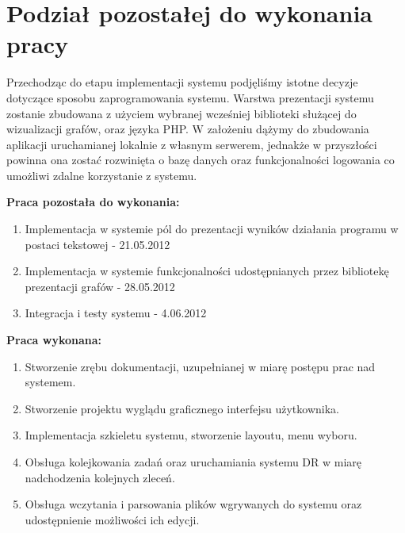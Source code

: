 \chapter{Podział pozostałej do wykonania pracy}
Przechodząc do etapu implementacji systemu podjęliśmy istotne decyzje dotyczące sposobu zaprogramowania systemu. Warstwa prezentacji systemu zostanie zbudowana z użyciem wybranej wcześniej biblioteki służącej do wizualizacji grafów, oraz języka PHP. W założeniu dążymy do zbudowania aplikacji uruchamianej lokalnie z własnym serwerem, jednakże w przyszłości powinna ona zostać rozwinięta o bazę danych oraz funkcjonalności logowania co umożliwi zdalne korzystanie z systemu. 


\textbf{Praca pozostała do wykonania:}

\begin{enumerate}
	\item Implementacja w systemie pól do prezentacji wyników działania programu w postaci tekstowej - 21.05.2012
	\item Implementacja w systemie funkcjonalności udostępnianych przez bibliotekę prezentacji grafów - 28.05.2012
	\item Integracja i testy systemu - 4.06.2012
\end{enumerate}


\textbf{Praca wykonana:}

\begin{enumerate}
	\item Stworzenie zrębu dokumentacji, uzupełnianej w miarę postępu prac nad systemem.
	\item Stworzenie projektu wyglądu graficznego interfejsu użytkownika.
	\item Implementacja szkieletu systemu, stworzenie layoutu, menu wyboru.
	\item Obsługa kolejkowania zadań oraz uruchamiania systemu DR w miarę nadchodzenia kolejnych zleceń.
	\item Obsługa wczytania i parsowania plików wgrywanych do systemu oraz udostępnienie możliwości ich edycji.
\end{enumerate}
